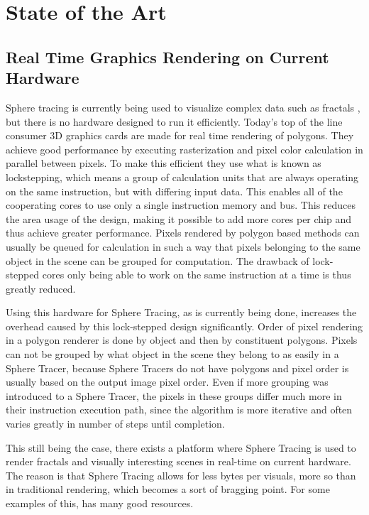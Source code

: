 \chapter{State of the Art}

	\section{ Real Time Graphics Rendering on Current Hardware } 

		Sphere tracing is currently being used to visualize complex data such
		as fractals \cite{TODO}, but there is no hardware designed to run it
		efficiently.  Today's top of the line consumer 3D graphics cards are
		made for real time rendering of polygons. They achieve good performance
		by executing rasterization and pixel color calculation in parallel
		between pixels. To make this efficient they use what is known as
		lockstepping, which means a group of calculation units that are always
		operating on the same instruction, but with differing input data. This
		enables all of the cooperating cores to use only a single instruction
		memory and bus. This reduces the area usage of the design, making it
		possible to add more cores per chip and thus achieve greater
		performance. Pixels rendered by polygon based methods can usually be
		queued for calculation in such a way that pixels belonging to the same
		object in the scene can be grouped for computation. The drawback of
		lock-stepped cores only being able to work on the same instruction at a
		time is thus greatly reduced.
		
		Using this hardware for Sphere Tracing, as is currently being done,
		increases the overhead caused by this lock-stepped design
		significantly. Order of pixel rendering in a polygon renderer
		 is done by object and then by constituent polygons.
		Pixels can not be grouped by what object in the scene
		they belong to as easily in a Sphere Tracer, because 
		Sphere Tracers do not have polygons and pixel
		order is usually based on the output image pixel order. Even if more
		grouping was introduced to a Sphere Tracer, the pixels in these groups
		differ much more in their instruction execution path, since the
		algorithm is more iterative and often varies greatly in number of steps
		until completion.
		
		This still being the case, there exists a platform where Sphere
		Tracing is used to render fractals and visually interesting scenes in
		real-time on current hardware. The reason is that Sphere Tracing allows
		for less bytes per visuals, more so than in traditional rendering,
		which becomes a sort of bragging point. For some examples of
		this, \cite{InigoQuilez} has many good resources.
		
